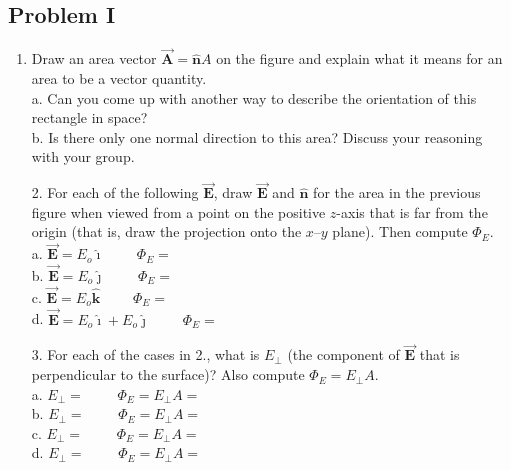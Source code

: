 \documentclass{article}
\newcommand{\ihat}[0]{\hat{\boldsymbol{\imath}}}
\newcommand{\jhat}[0]{\hat{\boldsymbol{\jmath}}}
\newcommand{\khat}[0]{\hat{\boldsymbol{k}}}
\newcommand{\bfvec}[1]{\vec{\mathbf{#1}}}
\begin{document}
\subsection{Problem I}



\begin{enumerate}

  \item Draw an area vector $\bfvec{A}=\hat{\mathbf{n}}A$ on the figure and explain what it means for an area to be a vector quantity.\\

        a. Can you come up with another way to describe the orientation of this rectangle in space?\\

        b. Is there only one normal direction to this area? Discuss your reasoning with your group.

\end{enumerate}

\begin{enumerate}

  \item[2.] For each of the following $\bfvec{E}$, draw  $\bfvec{E}$ and $\hat{\mathbf{n}}$ for the area in the previous figure when viewed from a point on the positive $z$-axis that is far from the origin (that is, draw the projection onto the $x$--$y$ plane). Then compute $\Phi_E$.\\

            a. $\bfvec{E}=E_o\ihat\qquad$ $\Phi_E=$\\

            b. $\bfvec{E}=E_o\jhat\qquad$ $\Phi_E=$\\

            c. $\bfvec{E}=E_o\khat\qquad$ $\Phi_E=$\\

            d. $\bfvec{E}=E_o\ihat + E_o\jhat\qquad$ $\Phi_E=$

\end{enumerate}

\begin{enumerate}

  \item[3.] For each of the cases in 2., what is $E_{\perp}$ (the component of $\bfvec{E}$ that is perpendicular to the surface)? Also compute $\Phi_E=E_{\perp}A$.\\

            a. $E_{\perp}=\qquad$ $\Phi_E=E_{\perp}A=$\\

            b. $E_{\perp}=\qquad$ $\Phi_E=E_{\perp}A=$\\

            c. $E_{\perp}=\qquad$ $\Phi_E=E_{\perp}A=$\\

            d. $E_{\perp}=\qquad$ $\Phi_E=E_{\perp}A=$

\end{enumerate}
\end{document}
